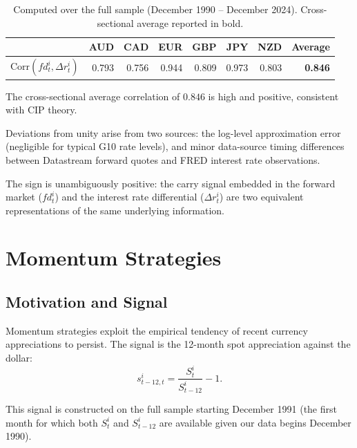\documentclass[a4paper,12pt]{article}
\begin{document}
\begin{table}[H]
\centering
\caption{Time-Series Correlation between Forward Discount $fd^i_t$ and Rate Differential $\Delta r^i_t$}
\label{tab:corr}
\renewcommand{\arraystretch}{1.3}
\begin{tabular}{lrrrrrr|r}
\toprule
 & AUD & CAD & EUR & GBP & JPY & NZD & \textbf{Average} \\
\midrule
$\mathrm{Corr}(fd^i_t, \Delta r^i_t)$ & 0.793 & 0.756 & 0.944 & 0.809 & 0.973 & 0.803 & \textbf{0.846} \\
\bottomrule
\end{tabular}
\caption*{\footnotesize Computed over the full sample (December 1990 -- December 2024).
Cross-sectional average reported in bold.}
\end{table}

The cross-sectional average correlation of $0.846$ is high and positive, consistent with
CIP theory.

Deviations from unity arise from two sources: the log-level approximation error (negligible
for typical G10 rate levels), and minor data-source timing differences between Datastream
forward quotes and FRED interest rate observations.

The sign is unambiguously positive: the carry signal embedded in the forward market
($fd^i_t$) and the interest rate differential ($\Delta r^i_t$) are two equivalent
representations of the same underlying information.

\section{Momentum Strategies}
\label{sec:momentum}

\subsection{Motivation and Signal}

Momentum strategies exploit the empirical tendency of recent currency appreciations to
persist. The signal is the 12-month spot appreciation against the dollar:
\begin{equation}
    s^i_{t-12,t} = \frac{S^i_t}{S^i_{t-12}} - 1.
\end{equation}

This signal is constructed on the full sample starting December 1991 (the first month for
which both $S^i_t$ and $S^i_{t-12}$ are available given our data begins December 1990).
\end{document}
